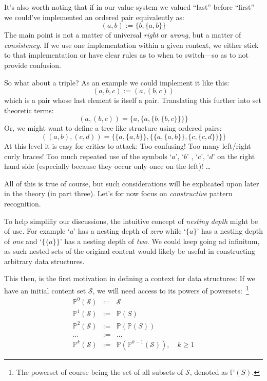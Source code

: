 \documentclass[twoside]{article}
\newcommand{\powerset}[2][P]{\ensuremath{\mathbb{#1}(#2)}}
\newcommand{\nthps}[2][P]{\ensuremath{\mathbb{#1}^{#2}}}
\newcommand{\of}[1]{\ensuremath{(\mathcal{#1})}}
\begin{document}
It's also worth noting that if in our value system we valued ``last''
before ``first'' we could've implemented an ordered pair equivalently as:
$$ (a,b):=\{b,\{a,b\}\} $$
The main point is not a matter of universal \emph{right} or \emph{wrong}, but a matter of \emph{consistency}.
If we use one implementation within a given context, we either stick to that implementation or have clear
rules as to when to switch---so as to not provide confusion.

So what about a triple? As an example we could implement it like this:
$$ (a,b,c):=(a,(b,c)) $$
which is a pair whose last element is itself a pair. Translating this further into set theoretic terms:
$$ (a,(b,c))=\{a,\{a,\{b,\{b,c\}\}\}\} $$
Or, we might want to define a tree-like structure using ordered pairs:
$$ ((a,b),(c,d))=\{\{a,\{a,b\}\},\{\{a,\{a,b\}\},\{c,\{c,d\}\}\}\} $$
At this level it is easy for critics to attack: Too confusing! Too many left/right curly braces!
Too much repeated use of the symbols `$ a $', `$ b $' , `$ c $', `$ d $' on the right hand side
(especially because they occur only once on the left)! \ldots

All of this is true of course, but such considerations will be explicated upon later in the theory (in part three).
Let's for now focus on \emph{constructive} pattern recognition.

To help simplifiy our discussions, the intuitive concept of \emph{nesting depth} might be of use. For example `$ a $' has
a nesting depth of \emph{zero} while `$ \{a\} $' has a nesting depth of \emph{one} and `$ \{\{a\}\} $' has a nesting depth
of \emph{two}. We could keep going ad infinitum, as such nested sets of the original content would likely be useful
in constructing arbitrary data structures.

This then, is the first motivation in defining a context for data structures: If we have an initial content set $ \mathcal{S} $,
we will need access to its powers of powersets:\ \footnote{The powerset of course being the set of all subsets of $ \mathcal{S} $,
denoted as $ \powerset{S} $.}
\begin{eqnarray*}
\nthps{0}\of{S} & := & \mathcal{S} \\
\nthps{1}\of{S} & := & \powerset{S} \\
\nthps{2}\of{S} & := & \powerset{\powerset{S}} \\
\ldots & := & \ldots \\
\nthps{k}\of{S} & := & \powerset{\nthps{k-1}\of{S}},\quad k\ge 1
\end{eqnarray*}
\end{document}
